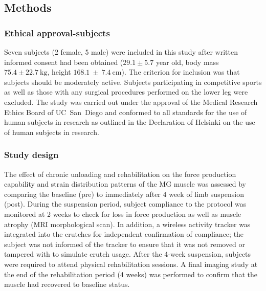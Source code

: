 \subsection{Methods}
\subsubsection{Ethical approval-subjects}
Seven subjects (2 female, 5 male) were included in this study after written informed consent had been obtained ($29.1 \pm 5.7$ year old, body mass $75.4 \pm \SI{22.7}{\kilogram}$, height $168.1~\pm~\SI{7.4}{\centi\meter}$). 
The criterion for inclusion was that subjects should be moderately active. 
Subjects participating in competitive sports as well as those with any surgical procedures performed on the lower leg were excluded. 
The study was carried out under the approval of the Medical Research Ethics Board of UC~San~Diego and conformed to all standards for the use of human subjects in research as outlined in the Declaration of Helsinki on the use of human subjects in research.
\subsubsection{Study design}
 The effect of chronic unloading and rehabilitation on the force production capability and strain distribution patterns of the MG muscle was assessed by comparing the baseline (pre) to immediately after 4 week of limb suspension (post).
 During the suspension period, subject compliance to the protocol was monitored at 2 weeks to check for loss in force production as well as muscle atrophy (MRI morphological scan). 
 In addition, a wireless activity tracker was integrated into the crutches for independent confirmation of compliance; the subject was not informed of the tracker to ensure that it was not removed or tampered with to simulate crutch usage. 
 After the 4-week suspension, subjects were required to attend physical rehabilitation sessions. 
 A final imaging study at the end of the rehabilitation period (4 weeks) was performed to confirm that the muscle had recovered to baseline status.
 
